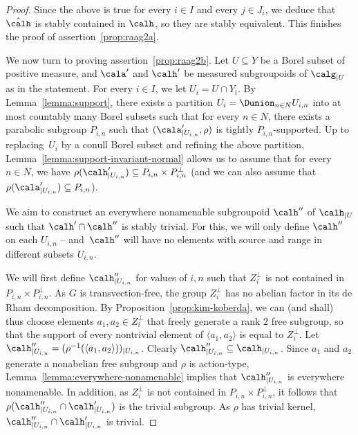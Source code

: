 \begin{proof}
Since the above is true for every $i\in I$ and every $j\in J_i$, we deduce that $\hat\calh$ is stably contained in $\calh$, so they are stably equivalent. This finishes the proof of assertion~\eqref{prop:raag2a}.

We now turn to proving assertion~\eqref{prop:raag2b}. Let $U\subseteq Y$ be a Borel subset of positive measure, and $\cala'$ and $\calh'$ be measured subgroupoids of $\calg_{|U}$ as in the statement. For every $i\in I$, we let $U_i=U\cap Y_i$. By Lemma~\ref{lemma:support}, there exists a partition $U_i=\Dunion_{n\in N} U_{i,n}$ into at most countably many Borel subsets such that for every $n\in N$, there exists a parabolic subgroup $P_{i,n}$ such that $(\cala'_{|U_{i,n}},\rho)$ is tightly $P_{i,n}$-supported. Up to repla\-cing~$U_i$ by a conull Borel subset and refining the above partition, Lemma~\ref{lemma:support-invariant-normal} allows us to assume that for every $n\in N$, we have $\rho(\calh'_{|U_{i,n}})\subseteq P_{i,n}\times P_{i,n}^{\perp}$ (and we can also assume that $\rho(\cala'_{|U_{i,n}})\subseteq P_{i,n}$).

We aim to construct an everywhere nonamenable subgroupoid $\calh''$ of $\calh_{|U}$ such that $\calh'\cap\calh''$ is stably trivial. For this, we will only define $\calh''$ on each $U_{i,n}$ -- and~$\calh''$ will have no elements with source and range in different subsets $U_{i,n}$.

We will first define $\calh''_{|U_{i,n}}$ for values of $i,n$ such that $Z^\perp_i$ is not contained in $P_{i,n}\times P^\perp_{i,n}$. As $G$ is transvection-free, the group $Z_i^\perp$ has no abelian factor in its de Rham decomposition. By Proposition~\ref{prop:kim-koberda}, we can (and shall) thus choose elements $a_{1},a_{2}\in Z_i^{\perp}$ that freely generate a rank $2$ free subgroup, so that the support of every nontrivial element of $\langle a_{1},a_{2}\rangle$ is equal to $Z_i^\perp$. Let $\calh''_{|U_{i,n}}=(\rho^{-1}(\langle a_{1},a_{2}\rangle))_{|U_{i,n}}$. Clearly $\calh''_{|U_{i,n}}\subseteq\calh_{|U_{i,n}}$. Since $a_{1}$ and $a_{2}$ generate a nonabelian free subgroup and $\rho$ is action-type, Lemma~\ref{lemma:everywhere-nonamenable} implies that $\calh''_{|U_{i,n}}$ is everywhere nonamenable. In addition, as $Z^\perp_i$ is not contained in $P_{i,n}\times P^\perp_{i,n}$, it follows that $\rho(\calh''_{|U_{i,n}}\cap \calh'_{|U_{i,n}})$ is the trivial subgroup. As $\rho$ has trivial kernel, $\calh''_{|U_{i,n}}\cap \calh'_{|U_{i,n}}$ is trivial.


\end{proof}
